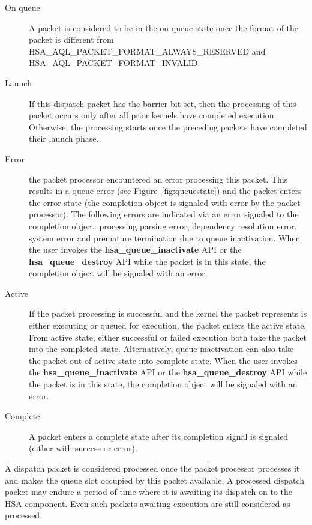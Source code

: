\documentclass[final]{book}
\newcommand{\reffun}[1]{\textbf{#1}}
\newcommand{\reftyp}[1]{#1}
\newcommand{\refenu}[1]{\reftyp{#1}}
\begin{document}
\begin{description}
\item[On queue] A packet is considered to be in the on queue state once the
  format of the packet is different from
  \refenu{HSA_AQL_PACKET_FORMAT_ALWAYS_RESERVED} and
  \refenu{HSA_AQL_PACKET_FORMAT_INVALID}.

\item[Launch] If this dispatch packet has the barrier bit set, then the
  processing of this packet occurs only after all prior kernels have completed
  execution. Otherwise, the processing starts once the preceding packets have
  completed their launch phase.

\item[Error] the packet processor encountered an error processing this
  packet. This results in a queue error (see Figure~\ref{fig:queuestate}) and
  the packet enters the error state (the completion object is signaled with
  error by the packet processor). The following errors are indicated via an
  error signaled to the completion object: processing parsing error, dependency
  resolution error, system error and premature termination due to queue
  inactivation. When the user invokes the \reffun{hsa_queue_inactivate} API
  or the \reffun{hsa_queue_destroy} API while the packet is in this state, the
  completion object will be signaled with an error.

\item[Active] If the packet processing is successful and the kernel the
  packet represents is either executing or queued for execution, the packet
  enters the active state. From active state, either successful or failed
  execution both take the packet into the completed state. Alternatively, queue
  inactivation can also take the packet out of active state into complete state.
  When the user invokes the \reffun{hsa_queue_inactivate} API or the
  \reffun{hsa_queue_destroy} API while the packet is in this state, the
  completion object will be signaled with an error.

\item[Complete] A packet enters a complete state after its completion
  signal is signaled (either with success or error).
\end{description}

A dispatch packet is considered processed once the packet processor processes it
and makes the queue slot occupied by this packet available. A processed dispatch
packet may endure a period of time where it is awaiting its dispatch on to the
HSA component. Even such packets awaiting execution are still considered as
processed.
\end{document}
